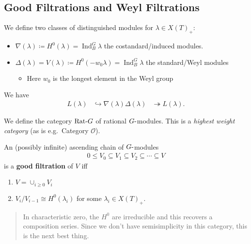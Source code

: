 \hypertarget{good-filtrations-and-weyl-filtrations}{%
\subsection{Good Filtrations and Weyl
Filtrations}\label{good-filtrations-and-weyl-filtrations}}

We define two classes of distinguished modules for
\(\lambda \in X(T)_+\):

\begin{itemize}
\tightlist
\item
  \(\nabla(\lambda) \coloneqq H^0(\lambda) = \operatorname{Ind}_B^G \lambda\)
  the costandard/induced modules.
\item
  \(\Delta(\lambda) = V(\lambda) \coloneqq H^0(-w_0 \lambda) = \operatorname{Ind}_B^G \lambda\)
  the standard/Weyl modules

  \begin{itemize}
  \tightlist
  \item
    Here \(w_0\) is the longest element in the Weyl group
  \end{itemize}
\end{itemize}

We have
\begin{align*}  
L(\lambda) &\hookrightarrow\nabla(\lambda)
\Delta(\lambda) &\twoheadrightarrow L(\lambda)
.\end{align*}

We define the category \(\text{Rat}{\hbox{-}}G\) of rational
\(G{\hbox{-}}\)modules. This is a \emph{highest weight category} (as is
e.g.~Category \({\mathcal{O}}\)).

\begin{definition}

An (possibly infinite) ascending chain of \(G{\hbox{-}}\)modules
\begin{align*}  
0 \leq V_0 \subseteq V_1 \subseteq V_2 \subseteq \cdots \subseteq V
\end{align*}
is a \textbf{good filtration} of \(V\) iff

\begin{enumerate}
\def\labelenumi{\arabic{enumi}.}
\item
  \(V = \cup_{i\geq 0} V_i\)
\item
  \(V_i/V_{i-1} \cong H^0(\lambda_i)\) for some
  \(\lambda_i \in X(T)_+\).
\end{enumerate}

\begin{quote}
In characteristic zero, the \(H^0\) are irreducible and this recovers a
composition series. Since we don't have semisimplicity in this category,
this is the next best thing.
\end{quote}

\end{definition}

